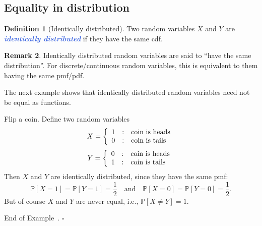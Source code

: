 \documentclass[10pt]{article}
\newtheorem{theorem}{Theorem}
\theoremstyle{definition}
\newtheorem{definition}[theorem]{Definition}
\newtheorem{remark}[theorem]{Remark}
\newtheorem{example}[theorem]{Example}
\renewenvironment{example}
{\begin{oldexample}}
  {\par\smallskip\hfill   End of Example~\theexample. $\square$    \par\end{oldexample}}
\newcommand{\1}[1]{\textbf{1}_{\left[#1\right]}} %
\def\P{\mathbb{P}} %
\newcommand{\demph}[1]{\textcolor{RoyalBlue}{\textbf{\slshape #1}}} %
\begin{document}
\subsection{Equality in distribution}
\begin{definition}[Identically distributed]
  \label{def:identically-distributed}
  Two random variables $X$ and $Y$ are \demph{identically distributed} if they
  have the same cdf.
\end{definition}
\begin{remark}
  Identically distributed random variables are said to ``have the same
  distribution''. For discrete/continuous random variables, this is equivalent
  to them having the same pmf/pdf.
\end{remark}

The next example shows that identically distributed random variables need not
be equal as functions.

\begin{example}
  Flip a coin. Define two random variables
  \begin{equation*}
    X = \left\{ \begin{array}{l@{\quad:\quad}l} 1 &\text{coin is heads} \\ 0&
        \text{coin is tails} \end{array}\right.
  \end{equation*}
  \begin{equation*}
    Y = \left\{ \begin{array}{l@{\quad:\quad}l} 0 &\text{coin is heads} \\ 1&
        \text{coin is tails} \end{array}\right.
  \end{equation*}
  Then $X$ and $Y$ are identically distributed, since they have the same pmf:
  \begin{equation*}
    \P\left[X=1 \right] = \P\left[Y=1 \right]=\frac{1}{2}
    \quad \text{and} \quad
    \P\left[X=0 \right] = \P\left[Y=0 \right]=\frac{1}{2}.
  \end{equation*}
  But of course $X$ and $Y$ are never equal, i.e., $\P\left[X\neq Y \right]=1$.
\end{example}

\end{document}
